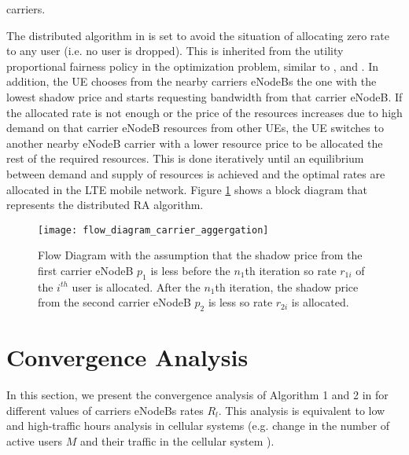 \documentclass[journal]{IEEEtran} 		\usepackage{amsmath,amssymb}
\begin{document}
carriers.

The distributed algorithm in \cite{Ahmed_Utility4} is set to avoid the situation of allocating zero rate to any user (i.e. no user is dropped). This is inherited from the utility proportional fairness policy in the optimization problem, similar to \cite{Ahmed_Utility1}, \cite{Ahmed_Utility2} and \cite{Ahmed_Utility3}. In addition, the UE chooses from the nearby carriers eNodeBs the one with the lowest shadow price and starts requesting bandwidth from that carrier eNodeB. If the allocated rate is not enough or the price of the resources increases due to high demand on that carrier eNodeB resources from other UEs, the UE switches to another nearby eNodeB carrier with a lower resource price to be allocated the rest of the required resources. This is done iteratively until an equilibrium between demand and supply of resources is achieved and the optimal rates are allocated in the LTE mobile network. Figure \ref{fig:multiple_app_flow_centralized} shows a block diagram that represents the distributed RA algorithm.
\begin{figure}[t!]
\centering
  \texttt{[image: flow\_diagram\_carrier\_aggergation]}
  \caption{Flow Diagram with the assumption that the shadow price from the first carrier eNodeB $p_1$ is less before the $n_1$th iteration so rate $r_{1i}$ of the $i^{th}$ user is allocated. After the $n_1$th iteration, the shadow price from the second carrier eNodeB $p_2$ is less so rate $r_{2i}$ is allocated.}
  \label{fig:multiple_app_flow_centralized}
\end{figure}
\section{Convergence Analysis}\label{sec:conv_analy}
In this section, we present the convergence analysis of Algorithm 1 and 2 in \cite{Ahmed_Utility4} for different values of carriers eNodeBs rates $R_l$. This analysis is equivalent to low and high-traffic hours analysis in cellular systems (e.g. change in the number of active users $M$ and their traffic in the cellular system \cite{Ahmed_Utility2}).
\end{document}
